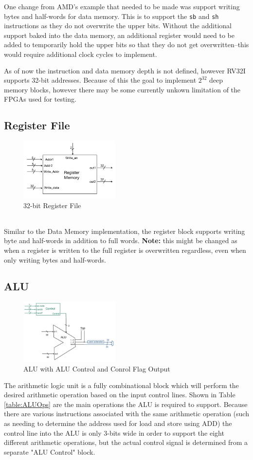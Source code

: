 \documentclass[lettersize,journal]{IEEEtran}
\begin{document}
One change from AMD's example that needed to be made was support writing bytes and half-words for data memory.
This is to support the \verb|sb| and \verb|sh| instructions as they do not overwrite the upper bits.
Without the additional support baked into the data memory,
an additional register would need to be added to temporarily hold the upper bits so that they do not get overwritten--this would require additional clock cycles to implement.

As of now the instruction and data memory depth is not defined, however RV32I supports 32-bit addresses.
Because of this the goal to implement $2^{32}$ deep memory blocks, however there may be some currently unkown limitation of the FPGAs used for testing.

\subsection{Register File}
\begin{figure}[!h]
    \label{fig:regblock}
    \centering
    \includegraphics[width=5cm]{CPTR380_registers.png}
    \caption{32-bit Register File}
\end{figure}
\color{red}{Incomplete..}\color{black}\\
Similar to the Data Memory implementation, the register block supports writing byte and half-words in addition to full words.
\textbf{Note:} this might be changed as when a register is written to the full register is overwritten regardless, even when only writing bytes and half-words.

\subsection{ALU}
\begin{figure}[!h]
    \label{fig:alublock}
    \centering
    \includegraphics[width=5cm]{CPTR380_ALU.png}
    \caption{ALU with ALU Control and Conrol Flag Output}
\end{figure}
The arithmetic logic unit is a fully combinational block which will perform the desired arithmetic operation based on the input control lines.
Shown in Table \ref{table:ALUOps} are the main operations the ALU is required to support. Because there are various instructions associated with the same
arithmetic operation (such as needing to determine the address used for load and store using ADD) the control line into the ALU is only 3-bits wide in order to support
the eight different arithmetic operations, but the actual control signal is determined from a separate "ALU Control" block.
\end{document}
